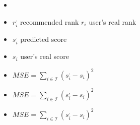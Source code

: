 \begin{itemize}
  \item 
  \item $r^,_i$ recommended rank
  \itme $r_i$ user's real rank
  \item $s^,_i$ predicted score
  \item $s_i$ user's real score
\end{itemize}

\begin{itemize}
\item $MSE=\sum_{i\in\mathcal{I}} (s^,_i - s_i)^2$ 
\item $MSE=\sum_{i\in\mathcal{I}} (s^,_i - s_i)^2$
\item $MSE=\sum_{i\in\mathcal{I}} (s^,_i - s_i)^2$
  
\end{itemize}
